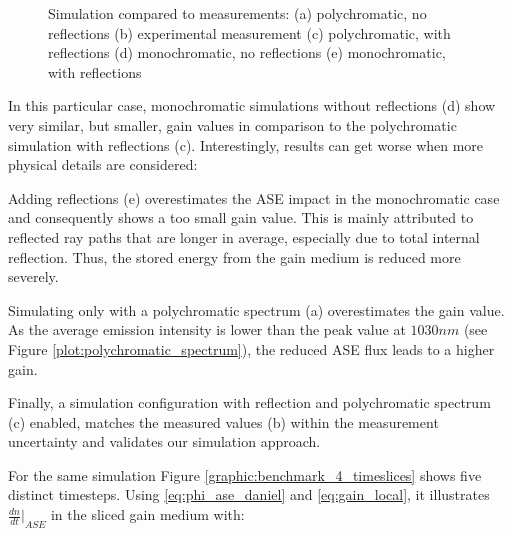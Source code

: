 \begin{figure}[H]
  \centerline{
    }
  \caption{Simulation compared to measurements:
    (a) polychromatic, no reflections
    (b) experimental measurement
    (c) polychromatic, with reflections
    (d) monochromatic, no reflections
    (e) monochromatic, with reflections}
  \label{plot:benchmark}
\end{figure}

In this particular case, monochromatic simulations without reflections
(d) show very similar, but smaller, gain values in comparison to the
polychromatic simulation with reflections (c).  Interestingly, results
can get worse when more physical details are considered:

Adding reflections (e) overestimates the ASE impact in the
monochromatic case and consequently shows a too small gain value.
This is mainly attributed to reflected ray paths that are longer in
average, especially due to total internal reflection.
Thus, the stored energy from the gain medium is reduced more severely.

Simulating only with a polychromatic spectrum (a) overestimates the
gain value. As the average emission intensity is lower than the peak
value at $1030 nm$ (see Figure \ref{plot:polychromatic_spectrum}), the
reduced ASE flux leads to a higher gain.

Finally, a simulation configuration with reflection and
polychromatic spectrum (c) enabled, matches the measured values (b)
within the measurement uncertainty and validates our simulation
approach.


For the same simulation Figure \ref{graphic:benchmark_4_timeslices} shows five distinct timesteps.
Using \eqref{eq:phi_ase_daniel} and \eqref{eq:gain_local}, it illustrates ${\frac{dn}{dt}|}_{ASE}$ in the sliced gain medium with:

